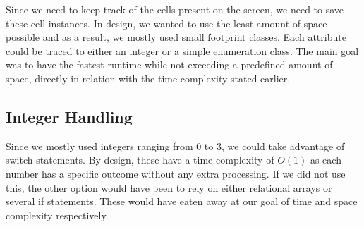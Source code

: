 \documentclass{article}
\begin{document}
Since we need to keep track of the cells present on the screen, we need to save these cell instances.
In design, we wanted to use the least amount of space possible and as a result, we mostly used small footprint classes.
Each attribute could be traced to either an integer or a simple enumeration class.
The main goal was to have the fastest runtime while not exceeding a predefined amount of space, directly in relation with the time complexity stated earlier.

\subsection{Integer Handling}

Since we mostly used integers ranging from 0 to 3, we could take advantage of switch statements.
By design, these have a time complexity of $O(1)$ as each number has a specific outcome without any extra processing.
If we did not use this, the other option would have been to rely on either relational arrays or several if statements.
These would have eaten away at our goal of time and space complexity respectively.
\end{document}
